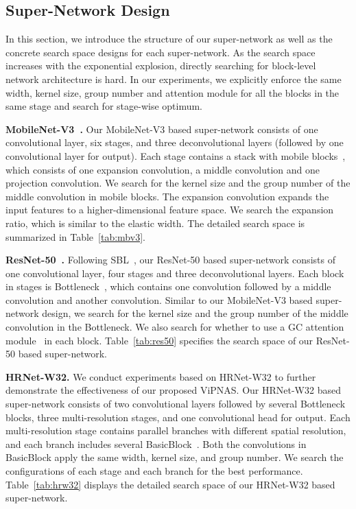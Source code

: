 \documentclass[final]{cvpr}
\begin{document}
\subsection{Super-Network Design}
\label{sec:supp_supernetwork}
In this section, we introduce the structure of our super-network as well as the concrete search space designs for each super-network. As the search space increases with the exponential explosion, directly searching for block-level network architecture is hard. In our experiments, we explicitly enforce the same width, kernel size, group number and attention module for all the blocks in the same stage and search for stage-wise optimum.

\textbf{MobileNet-V3~\cite{howard2019searching}.}
Our MobileNet-V3 based super-network consists of one convolutional layer, six stages, and three deconvolutional layers (followed by one  convolutional layer for output). Each stage contains a stack with mobile blocks~\cite{howard2019searching}, which consists of one  expansion convolution, a middle convolution and one  projection convolution. We search for the kernel size and the group number of the middle convolution in mobile blocks. The expansion convolution expands the input features to a higher-dimensional feature space. We search the expansion ratio, which is similar to the elastic width. The detailed search space is summarized in Table~\ref{tab:mbv3}.

\textbf{ResNet-50~\cite{he2016deep}.}
Following SBL~\cite{xiao2018simple}, our ResNet-50 based super-network consists of one convolutional layer, four stages and three deconvolutional layers. Each block in stages is Bottleneck~\cite{he2016deep}, which contains one  convolution followed by a middle convolution and another  convolution. Similar to our MobileNet-V3 based super-network design, we search for the kernel size and the group number of the middle convolution in the Bottleneck. We also search for whether to use a GC attention module~\cite{cao2019gcnet} in each block. Table~\ref{tab:res50} specifies the search space of our ResNet-50 based super-network.



\textbf{HRNet-W32\cite{sun2019deep}.}
We conduct experiments based on HRNet-W32 to further demonstrate the effectiveness of our proposed ViPNAS. Our HRNet-W32 based super-network consists of two convolutional layers followed by several Bottleneck blocks, three multi-resolution stages, and one  convolutional head for output. Each multi-resolution stage contains parallel branches with different spatial resolution, and each branch includes several BasicBlock~\cite{he2016deep}. Both the convolutions in BasicBlock apply the same width, kernel size, and group number. We search the configurations of each stage and each branch for the best performance. Table~\ref{tab:hrw32} displays the detailed search space of our HRNet-W32 based super-network.
\end{document}
